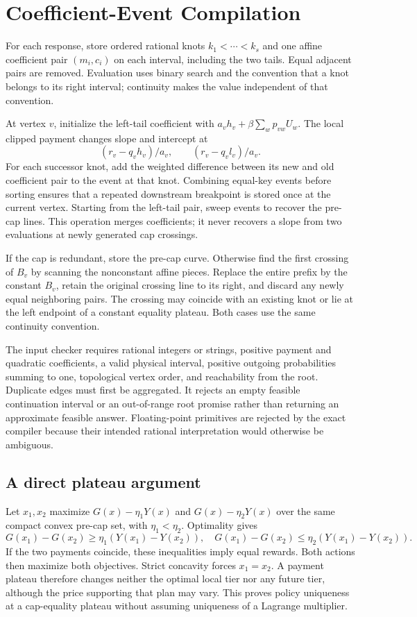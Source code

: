 \section{Coefficient-Event Compilation}\label{ec:events}
For each response, store ordered rational knots $k_1<\cdots<k_s$ and one affine coefficient pair $(m_i,c_i)$ on each interval, including the two tails. Equal adjacent pairs are removed. Evaluation uses binary search and the convention that a knot belongs to its right interval; continuity makes the value independent of that convention.

At vertex $v$, initialize the left-tail coefficient with $a_vh_v+\beta\sum_wp_{vw}U_w$. The local clipped payment changes slope and intercept at
\[
 (r_v-q_vh_v)/a_v,\qquad (r_v-q_vl_v)/a_v.
\]
For each successor knot, add the weighted difference between its new and old coefficient pair to the event at that knot. Combining equal-key events before sorting ensures that a repeated downstream breakpoint is stored once at the current vertex. Starting from the left-tail pair, sweep events to recover the pre-cap lines. This operation merges coefficients; it never recovers a slope from two evaluations at newly generated cap crossings.

If the cap is redundant, store the pre-cap curve. Otherwise find the first crossing of $B_v$ by scanning the nonconstant affine pieces. Replace the entire prefix by the constant $B_v$, retain the original crossing line to its right, and discard any newly equal neighboring pairs. The crossing may coincide with an existing knot or lie at the left endpoint of a constant equality plateau. Both cases use the same continuity convention.

The input checker requires rational integers or strings, positive payment and quadratic coefficients, a valid physical interval, positive outgoing probabilities summing to one, topological vertex order, and reachability from the root. Duplicate edges must first be aggregated. It rejects an empty feasible continuation interval or an out-of-range root promise rather than returning an approximate feasible answer. Floating-point primitives are rejected by the exact compiler because their intended rational interpretation would otherwise be ambiguous.

\subsection{A direct plateau argument}
Let $x_1,x_2$ maximize $G(x)-\eta_1Y(x)$ and $G(x)-\eta_2Y(x)$ over the same compact convex pre-cap set, with $\eta_1<\eta_2$. Optimality gives
\[
 G(x_1)-G(x_2)\geq\eta_1(Y(x_1)-Y(x_2)),\quad
 G(x_1)-G(x_2)\leq\eta_2(Y(x_1)-Y(x_2)).
\]
If the two payments coincide, these inequalities imply equal rewards. Both actions then maximize both objectives. Strict concavity forces $x_1=x_2$. A payment plateau therefore changes neither the optimal local tier nor any future tier, although the price supporting that plan may vary. This proves policy uniqueness at a cap-equality plateau without assuming uniqueness of a Lagrange multiplier.

